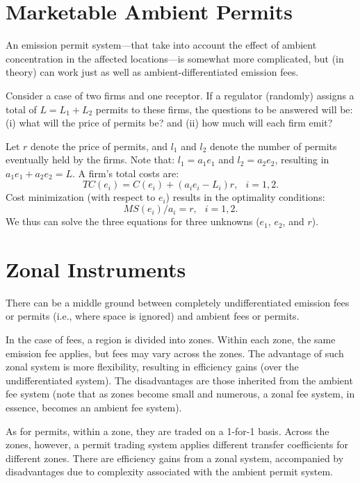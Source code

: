 \documentclass[
]{book}
\begin{document}
\hypertarget{marketable-ambient-permits}{%
\section{Marketable Ambient Permits}\label{marketable-ambient-permits}}

An emission permit system---that take into account the effect of ambient concentration in the affected locations---is somewhat more complicated, but (in theory) can work just as well as ambient-differentiated emission fees.

Consider a case of two firms and one receptor. If a regulator (randomly) assigns a total of \(L=L_1+L_2\) permits to these firms, the questions to be answered will be: (i) what will the price of permits be? and (ii) how much will each firm emit?

Let \(r\) denote the price of permits, and \(l_1\) and \(l_2\) denote the number of permits eventually held by the firms. Note that: \(l_1=a_1 e_1\) and \(l_2=a_2 e_2\), resulting in \(a_1 e_1 + a_2 e_2 =L\). A firm's total costs are: \[TC(e_i) = C(e_i)+(a_i e_i - L_i)r,\;~~i=1,2.\] Cost minimization (with respect to \(e_i\)) results in the optimality conditions: \[MS(e_i)/a_i = r,\;~~i=1,2.\] We thus can solve the three equations for three unknowns (\(e_1\), \(e_2\), and \(r\)).

\hypertarget{zonal-instruments}{%
\section{Zonal Instruments}\label{zonal-instruments}}

There can be a middle ground between completely undifferentiated emission fees or permits (i.e., where space is ignored) and ambient fees or permits.

In the case of fees, a region is divided into zones. Within each zone, the same emission fee applies, but fees may vary across the zones. The advantage of such zonal system is more flexibility, resulting in efficiency gains (over the undifferentiated system). The disadvantages are those inherited from the ambient fee system (note that as zones become small and numerous, a zonal fee system, in essence, becomes an ambient fee system).

As for permits, within a zone, they are traded on a 1-for-1 basis. Across the zones, however, a permit trading system applies different transfer coefficients for different zones. There are efficiency gains from a zonal system, accompanied by disadvantages due to complexity associated with the ambient permit system.
\end{document}
